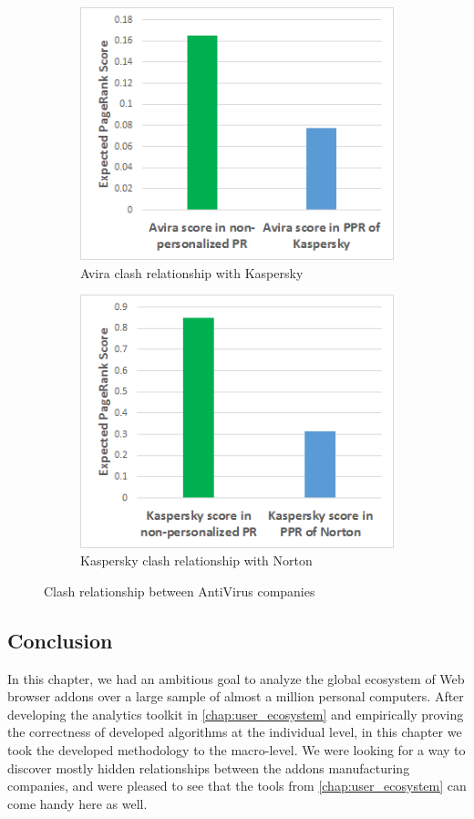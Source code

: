 \documentclass[ijoc,nonblindrev]{informs3} %
\numberwithin{equation}{subsection}
\begin{document}
\begin{figure}[!htbp]
\centering
\begin{subfigure}[b]{0.8\textwidth}
	\centering
\includegraphics[scale=0.8]{figures/avira_clash_kaspersky.png}
\caption{Avira clash relationship with Kaspersky}
\label{fig:avira_clash_kaspersky}
\end{subfigure}
\begin{subfigure}[b]{0.8\textwidth}
	\centering
\includegraphics[scale=0.8]{figures/kaspersky_clash_norton_2.png}
\caption{Kaspersky clash relationship with Norton}
\label{fig:kaspersky_clash_norton}
\end{subfigure}
\caption{Clash relationship between AntiVirus companies}
	\label{fig:clash_av}
\end{figure}
\fi


\subsection{Conclusion}
\label{sec:clash_conclusion}
In this chapter, we had an ambitious goal to analyze the global ecosystem of Web browser addons over a large sample of almost a million personal computers. After developing the analytics toolkit in \autoref{chap:user_ecosystem} and empirically proving the correctness of developed algorithms at the individual level, in this chapter we took the developed methodology to the macro-level.
We were looking for a way to discover mostly hidden relationships between the addons manufacturing companies, and were pleased to see that the tools from \autoref{chap:user_ecosystem} can come handy here as well.
\end{document}
